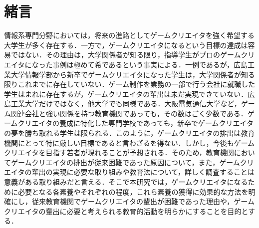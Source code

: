 \section{緒言}

情報系専門分野においては，将来の進路としてゲームクリエイタを強く希望する大学生が多く存在する．一方で，ゲームクリエイタになるという目標の達成は容易ではない．その理由は，大学関係者が知る限り，指導学生がプロのゲームクリエイタになった事例は極めて希であるという事実による．一例であるが，広島工業大学情報学部から新卒でゲームクリエイタになった学生は，大学関係者が知る限りこれまでに存在していない．ゲーム制作を業務の一部で行う会社に就職した学生はまれに存在するが，ゲームクリエイタの輩出は未だ実現できていない．広島工業大学だけではなく，他大学でも同様である．大阪電気通信大学など，ゲーム関連会社と強い関係を持つ教育機関であっても，その数はごく少数である．ゲームクリエイタの養成に特化した専門学校であっても，新卒でゲームクリエイタの夢を勝ち取れる学生は限られる．このように，ゲームクリエイタの排出は教育機関にとって特に厳しい目標であると言わざるを得ない．しかし，今後もゲームクリエイタを目指す若者が現れることが予想される．そのため，教育機関においてゲームクリエイタの排出が従来困難であった原因について，また，ゲームクリエイタの輩出の実現に必要な取り組みや教育法について，詳しく調査することは意義がある取り組みだと言える．そこで本研究では，ゲームクリエイタになるために必要となる各素養やそれぞれの程度，これら素養の獲得に効果的な方法を明確にし，従来教育機関でゲームクリエイタの輩出が困難であった理由や，ゲームクリエイタの輩出に必要と考えられる教育的活動を明らかにすることを目的とする．